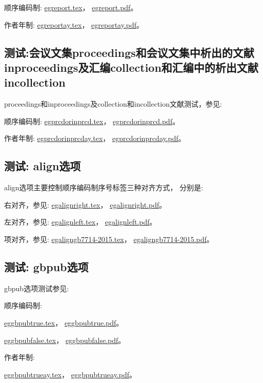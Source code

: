 顺序编码制:
\href{run:./egreport.tex}{egreport.tex}，
\href{run:./egreport.pdf}{egreport.pdf}。

作者年制:
\href{run:./egreportay.tex}{egreportay.tex}，
\href{run:./egreportay.pdf}{egreportay.pdf}。


\subsection{测试:会议文集proceedings和会议文集中析出的文献inproceedings及汇编collection和汇编中的析出文献incollection}

proceedings和inproceedings及collection和incollection文献测试，参见:

顺序编码制:
\href{run:./egprcdorinprcd.tex}{egprcdorinprcd.tex}，
\href{run:./egprcdorinprcd.pdf}{egprcdorinprcd.pdf}。

作者年制:
\href{run:./egprcdorinprcday.tex}{egprcdorinprcday.tex}，
\href{run:./egprcdorinprcday.pdf}{egprcdorinprcday.pdf}。


\subsection{测试: align选项}\label{sec:align:test}
align选项主要控制顺序编码制序号标签三种对齐方式，
分别是:

右对齐，参见:
\href{run:./egalignright.tex}{egalignright.tex}，
\href{run:./egalignright.pdf}{egalignright.pdf}。

左对齐，参见:
\href{run:./egalignleft.tex}{egalignleft.tex}，
\href{run:./egalignleft.pdf}{egalignleft.pdf}。

项对齐，参见:
\href{run:./egaligngb7714-2015.tex}{egaligngb7714-2015.tex}，
\href{run:./egaligngb7714-2015.pdf}{egaligngb7714-2015.pdf}。

\subsection{测试: gbpub选项}\label{sec:option:deal}
gbpub选项测试参见:

顺序编码制:

\href{run:./eggbpubtrue.tex}{eggbpubtrue.tex}，
\href{run:./eggbpubtrue.pdf}{eggbpubtrue.pdf}。

\href{run:./eggbpubfalse.tex}{eggbpubfalse.tex}，
\href{run:./eggbpubfalse.pdf}{eggbpubfalse.pdf}。

作者年制:

\href{run:./eggbpubtrueay.tex}{eggbpubtrueay.tex}，
\href{run:./eggbpubtrueay.pdf}{eggbpubtrueay.pdf}。

